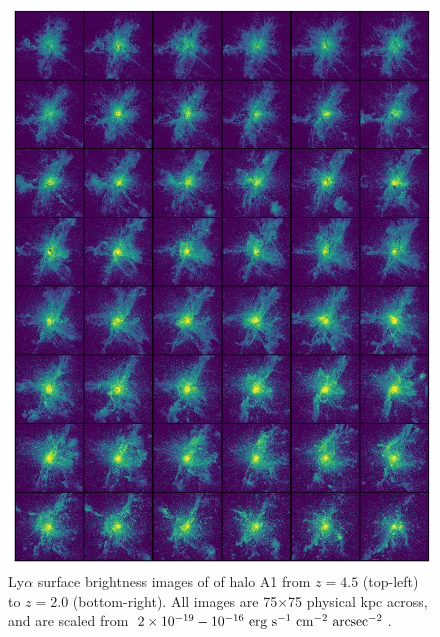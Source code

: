 \begin{figure}
    \centering
    \includegraphics[width=\textwidth,keepaspectratio]{figures/rogues_A1.png}
    \caption{
        Ly$\alpha$ surface brightness images of of halo A1 from $z=4.5$ (top-left) to $z=2.0$ (bottom-right).
        All images are 75$\times$75 physical kpc across, and are scaled from $2\times 10^{-19}-10^{-16}\ \rm{erg}\ \rm{s}^{-1}\ \rm{cm}^{-2}\ \rm{arcsec}^{-2}$.
    }
  \label{fig:rogues1}
\end{figure}

